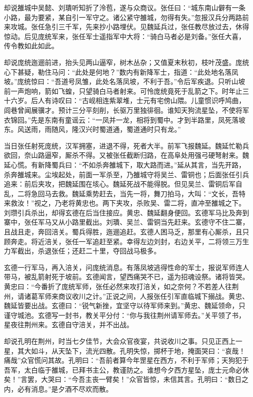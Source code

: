 却说雒城中吴懿、刘璝听知折了泠苞，遂与众商议。张任曰：“城东南山僻有一条小路，最为要紧，某自引一军守之。诸公紧守雒城，勿得有失。”忽报汉兵分两路前来攻城。张任急引三千军，先来抄小路埋伏。见魏延兵过，张任教尽放过去，休得惊动。后见庞统军来，张任军士遥指军中大将：“骑白马者必是刘备。”张任大喜，传令教如此如此。

却说庞统迤逦前进，抬头见两山逼窄，树木丛杂；又值夏末秋初，枝叶茂盛。庞统心下甚疑，勒住马问：“此处是何地？”数内有新降军士，指道：“此处地名落凤坡。”庞统惊曰：“吾道号凤雏，此处名落凤坡，不利于吾。”令后军疾退。只听山坡前一声炮响，箭如飞蝗，只望骑白马者射来。可怜庞统竟死于乱箭之下。时年止三十六岁。后人有诗叹曰：“古岘相连紫翠堆，士元有宅傍山隈。儿童惯识呼鸠曲，闾巷曾闻展骥才。预计三分平刻削，长驱万里独徘徊。谁知天狗流星坠，不使将军衣锦回。”先是东南有童谣云：“一凤并一龙，相将到蜀中。才到半路里，凤死落坡东。风送雨，雨随风，隆汉兴时蜀道通，蜀道通时只有龙。”

当日张任射死庞统，汉军拥塞，进退不得，死者大半。前军飞报魏延。魏延忙勒兵欲回，奈山路逼窄，厮杀不得。又被张任截断归路，在高阜处用强弓硬弩射来。魏延心慌。有新降蜀兵曰：“不如杀奔雒城下，取大路而进。”延从其言，当先开路，杀奔雒城来。尘埃起处，前面一军杀至，乃雒城守将吴兰、雷铜也；后面张任引兵追来：前后夹攻，把魏延围在垓心。魏延死战不能得脱。但见吴兰、雷铜后军自乱，二将急回马去救。魏延乘势赶去，当先一将，舞刀拍马，大叫：“文长，吾特来救汝！”视之，乃老将黄忠也。两下夹攻，杀败吴、雷二将，直冲至雒城之下。刘瓒引兵杀出，却得玄德在后当住接应。黄忠、魏延翻身便回。玄德军马比及奔到寨中，张任军马又从小路里截出。刘璝、吴兰、雷铜当先赶来。玄德守不住二寨，且战且走，奔回涪关。蜀兵得胜，迤逦追赶。玄德人困马乏，那里有心厮杀，且只顾奔走。将近涪关，张任一军追赶至紧。幸得左边刘封，右边关平，二将领三万生力军截出，杀退张任；还赶二十里，夺回战马极多。

玄德一行军马，再入涪关，问庞统消息。有落凤坡逃得性命的军士，报说军师连人带马，被乱箭射死于坡前。玄德闻言，望西痛哭不已，遥为招魂设祭。诸将皆哭。黄忠曰：“今番折了庞统军师，张任必然来攻打涪关，如之奈何？不若差人往荆州，请诸葛军师来商议收川之计。”正说之间，人报张任引军直临城下搦战。黄忠、魏延皆要出战。玄德曰：“锐气新挫，宜坚守以待军师来到。”黄忠、魏延领命，只谨守城池。玄德写一封书，教关平分付：“你与我往荆州请军师去。”关平领了书，星夜往荆州来。玄德自守涪关，并不出战。

却说孔明在荆州，时当七夕佳节，大会众官夜宴，共说收川之事。只见正西上一星，其大如斗，从天坠下，流光四散。孔明失惊，掷杯于地，掩面哭曰：“哀哉！痛哉”众官慌问其故。孔明曰：“吾前者算今年罡星在西方，不利于军师；天狗犯于吾军，太白临于雒城，已拜书主公，教谨防之。谁想今夕西方星坠，庞士元命必休矣！”言罢，大哭曰：“今吾主丧一臂矣！”众官皆惊，未信其言。孔明曰：“数日之内，必有消息。”是夕酒不尽欢而散。


